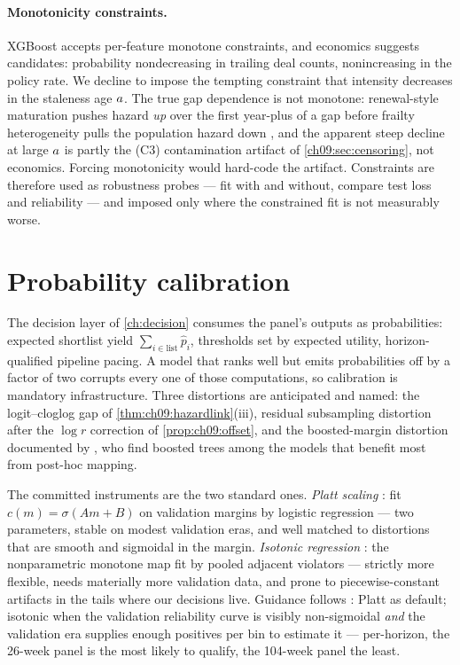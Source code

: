 \paragraph{Monotonicity constraints.} XGBoost accepts per-feature
monotone constraints, and economics suggests candidates: probability
nondecreasing in trailing deal counts, nonincreasing in the policy rate.
We decline to impose the tempting constraint that intensity decreases
in the staleness age $a$. The true gap dependence
is not monotone: renewal-style maturation pushes hazard \emph{up} over
the first year-plus of a gap before frailty heterogeneity pulls the
population hazard down \citep{vaupel1979,aalen2008}, and the apparent
steep decline at large $a$ is partly the (C3) contamination
artifact of \cref{ch09:sec:censoring}, not economics. Forcing
monotonicity would hard-code the artifact. Constraints are therefore
used as robustness probes --- fit with and without, compare test loss
and reliability --- and imposed only where the constrained fit is not
measurably worse.

\section{Probability calibration}\label{ch09:sec:calibration}

The decision layer of \cref{ch:decision} consumes the panel's outputs as
probabilities: expected shortlist yield $\sum_{i \in \text{list}}
\hat p_i$, thresholds set by expected utility, horizon-qualified
pipeline pacing. A model that ranks well but emits probabilities off by
a factor of two corrupts every one of those computations, so
calibration is mandatory infrastructure. Three distortions are
anticipated and named: the
logit--cloglog gap of \cref{thm:ch09:hazardlink}(iii), residual
subsampling distortion after the $\log r$ correction of
\cref{prop:ch09:offset}, and the boosted-margin distortion documented by
\citet{niculescumizil2005}, who find boosted trees among the models that
benefit most from post-hoc mapping.

The committed instruments are the two standard ones. \emph{Platt
scaling} \citep{platt1999}: fit $c(m) = \sigma(Am + B)$ on validation
margins by logistic regression --- two parameters, stable on modest
validation eras, and well matched to distortions that are smooth and
sigmoidal in the margin. \emph{Isotonic regression}
\citep{zadroznyelkan2002}: the nonparametric monotone map fit by pooled
adjacent violators --- strictly more flexible, needs materially more
validation data, and prone to piecewise-constant artifacts in the tails
where our decisions live. Guidance follows
\citet{niculescumizil2005}: Platt as default; isotonic when the
validation reliability curve is visibly non-sigmoidal \emph{and} the
validation era supplies enough positives per bin to estimate it ---
per-horizon, the 26-week panel is the most likely to qualify, the
104-week panel the least.

